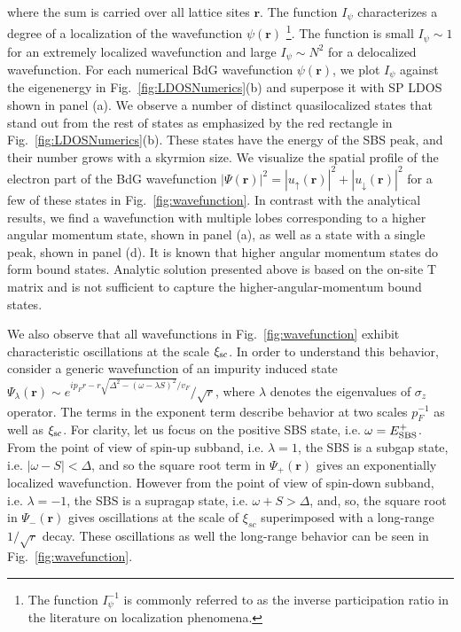 \documentclass[twocolumn,showpacs,floatfix,longbibliography]{revtex4-1}
\begin{document}
where the sum is carried over all lattice sites $\bm r$. The function $I_\psi$ characterizes a degree of a localization of the wavefunction $\psi(\bm r)$ \footnote{The function $I_\psi^{-1}$ is commonly referred to as the inverse participation ratio in the literature on localization phenomena.}. The function is small $I_\psi \sim 1$ for an extremely localized wavefunction and large $I_\psi \sim N^2$ for a delocalized wavefunction. For each numerical BdG wavefunction $\psi(\bm r)$, we plot $I_\psi$ against the eigenenergy in Fig.~\ref{fig:LDOSNumerics}(b) and superpose it with SP LDOS shown in panel (a). We observe a number of distinct quasilocalized states that stand out from the rest of states as emphasized by the red rectangle in Fig.~\ref{fig:LDOSNumerics}(b). These states have the energy of the SBS peak, and their number grows with a skyrmion size. We visualize the spatial profile of the electron part of the BdG wavefunction $|\Psi(\bm r)|^2 = |u_{\uparrow}(\bm r)|^2+|u_{\downarrow}(\bm r)|^2$  for a few of these states in Fig.~\ref{fig:wavefunction}. In contrast with the analytical results, we find a wavefunction with multiple lobes corresponding to a higher angular momentum state, shown in panel (a), as well as a state with a single peak, shown in panel (d). It is known that higher angular momentum states do form bound states. Analytic solution presented above is based on the on-site T matrix and is not sufficient to capture the higher-angular-momentum bound states.

We also observe that all wavefunctions in Fig.~\ref{fig:wavefunction} exhibit characteristic oscillations at the scale $\xi_{\rm sc}$. In order to understand this behavior, consider a generic wavefunction of an impurity induced state ${\Psi_\lambda(\bm r) \sim e^{ip_Fr-r\sqrt{\Delta^2-(\omega - \lambda S)^2}/v_F}/\sqrt{r}}$, where $\lambda$ denotes the eigenvalues of $\sigma_z$ operator. The terms in the exponent term describe behavior at two scales $p_F^{-1}$ as well as $\xi_{\rm sc}$. For clarity, let us focus on the positive SBS state, i.e. $\omega = E^{+}_{\rm SBS}$. From the point of view of spin-up subband, i.e. $\lambda = 1$, the SBS is a subgap state, i.e. $|\omega- S|<\Delta$, and so the square root term in $\Psi_+(\bm r)$ gives an exponentially localized wavefunction. However from the point of view of spin-down subband, i.e. $\lambda = -1$, the SBS is a supragap state, i.e. $\omega+S>\Delta$, and, so, the square root in $\Psi_-(\bm r)$ gives oscillations  at the scale of $\xi_{sc}$ superimposed with a long-range $1/\sqrt{r}$ decay. These oscillations as well the long-range behavior can be seen in Fig.~\ref{fig:wavefunction}.
\end{document}
